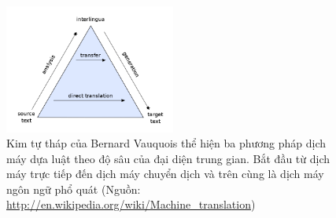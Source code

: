 \begin{figure}
	\centering
	\includegraphics[width=0.5\textwidth]{rulebasedpyramid}
	\caption[Ba phương pháp dịch máy dựa trên luật]{Kim tự tháp của Bernard Vauquois thể hiện ba phương pháp dịch máy dựa luật theo độ sâu của đại diện trung gian. Bắt đầu từ dịch máy trực tiếp đến dịch máy chuyển dịch và trên cùng là dịch máy ngôn ngữ phổ quát (Nguồn: \href{http://en.wikipedia.org/wiki/Machine_translation}{http://en.wikipedia.org/wiki/Machine\_translation})}
	\label{fig_rulebasedpyramid}
\end{figure}

